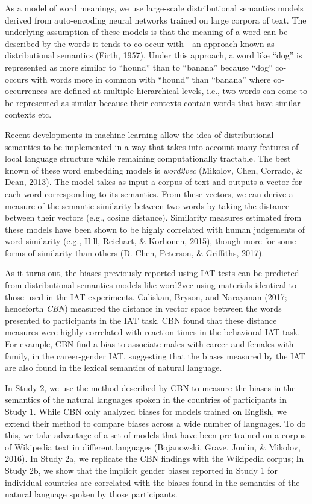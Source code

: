\documentclass[10pt, letterpaper]{article}
\begin{document}
As a model of word meanings, we use large-scale distributional semantics
models derived from auto-encoding neural networks trained on large
corpora of text. The underlying assumption of these models is that the
meaning of a word can be described by the words it tends to co-occur
with---an approach known as distributional semantics (Firth, 1957).
Under this approach, a word like ``dog'' is represented as more similar
to ``hound'' than to ``banana'' because ``dog'' co-occurs with words
more in common with ``hound'' than ``banana'' where co-occurrences are
defined at multiple hierarchical levels, i.e., two words can come to be
represented as similar because their contexts contain words that have
similar contexts etc.

Recent developments in machine learning allow the idea of distributional
semantics to be implemented in a way that takes into account many
features of local language structure while remaining computationally
tractable. The best known of these word embedding models is
\emph{word2vec} (Mikolov, Chen, Corrado, \& Dean, 2013). The model takes
as input a corpus of text and outputs a vector for each word
corresponding to its semantics. From these vectors, we can derive a
measure of the semantic similarity between two words by taking the
distance between their vectors (e.g., cosine distance). Similarity
measures estimated from these models have been shown to be highly
correlated with human judgements of word similarity (e.g., Hill,
Reichart, \& Korhonen, 2015), though more for some forms of similarity
than others (D. Chen, Peterson, \& Griffiths, 2017).

As it turns out, the biases previously reported using IAT tests can be
predicted from distributional semantics models like word2vec using
materials identical to those used in the IAT experiments. Caliskan,
Bryson, and Narayanan (2017; henceforth \emph{CBN}) measured the
distance in vector space between the words presented to participants in
the IAT task. CBN found that these distance measures were highly
correlated with reaction times in the behavioral IAT task. For example,
CBN find a bias to associate males with career and females with family,
in the career-gender IAT, suggesting that the biases measured by the IAT
are also found in the lexical semantics of natural language.

In Study 2, we use the method described by CBN to measure the biases in
the semantics of the natural languages spoken in the countries of
participants in Study 1. While CBN only analyzed biases for models
trained on English, we extend their method to compare biases across a
wide number of languages. To do this, we take advantage of a set of
models that have been pre-trained on a corpus of Wikipedia text in
different languages (Bojanowski, Grave, Joulin, \& Mikolov, 2016). In
Study 2a, we replicate the CBN findings with the Wikipedia corpus; In
Study 2b, we show that the implicit gender biases reported in Study 1
for individual countries are correlated with the biases found in the
semantics of the natural language spoken by those participants.
\end{document}
